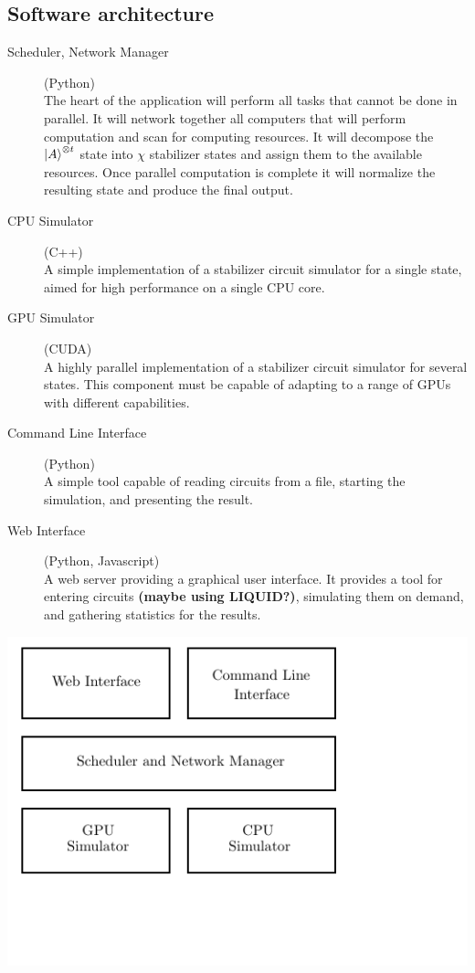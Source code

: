 \documentclass[11pt]{article}
\begin{document}
\begin{multicols}{2}
\subsection*{Software architecture}


\begin{description}
    \item[Scheduler, Network Manager] (Python) \\
        The heart of the application will perform all tasks that cannot be done in parallel. It will network together all computers that will perform computation and scan for computing resources. It will decompose the ${\left\vert{A}\right\rangle}^{\otimes t}$ state into $\chi$ stabilizer states and assign them to the available resources. Once parallel computation is complete it will normalize the resulting state and produce the final output.
    \item[CPU Simulator] (C++) \\
        A simple implementation of a stabilizer circuit simulator for a single state, aimed for high performance on a single CPU core.
    \item[GPU Simulator] (CUDA) \\
        A highly parallel implementation of a stabilizer circuit simulator for several states. This component must be capable of adapting to a range of GPUs with different capabilities.
    \item[Command Line Interface] (Python) \\
        A simple tool capable of reading circuits from a file, starting the simulation, and presenting the result.
    \item[Web Interface] (Python, Javascript) \\
        A web server providing a graphical user interface. It provides a tool for entering circuits \textbf{(maybe using LIQUID?)}, simulating them on demand, and gathering statistics for the results.
\end{description}

\begin{Figure}
\hspace{0.1in}
\includegraphics{diagrams/architecture.pdf}


\end{Figure}
\end{multicols}
\end{document}

